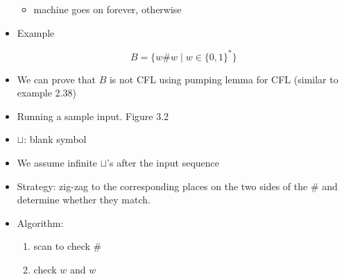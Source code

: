 \begin{frame}[allowframebreaks]
\begin{itemize}
\begin{itemize}
  \item machine goes on forever, otherwise
  \end{itemize}
\item Example

  \begin{equation*}
B=\{w\#w\mid w \in \{0,1\}^*\}
\end{equation*}
\item We can prove that $B$ is not CFL using pumping lemma for CFL (similar to example 2.38)

\item Running a sample input. Figure 3.2
\item $\sqcup$: blank symbol
\item [] We assume infinite $\sqcup$'s after the input sequence
\item Strategy: zig-zag to the corresponding places on the two sides of the \# and determine
  whether they match.
  
\begin{center}
\end{center}



\item Algorithm:
  \begin{enumerate}
  \item scan to check \#
  \item check $w$ and $w$
  \end{enumerate}

\end{itemize}
\end{frame}

